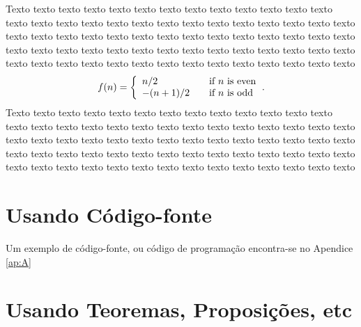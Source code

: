 Texto texto texto texto texto texto texto texto texto texto texto texto texto texto texto texto texto texto texto texto texto texto texto texto texto texto texto texto texto texto texto texto texto texto texto texto texto texto texto texto texto texto texto texto texto texto texto texto texto texto texto texto texto texto texto texto texto texto texto texto texto texto texto texto texto texto texto texto texto
	\begin{equation}
	\label{eq:sistema}
		\begin{aligned}
			f(n) = \left\{ 
			\begin{array}{l l}
			n/2 & \quad \text{if $n$ is even}\\
			-(n+1)/2 & \quad \text{if $n$ is odd}
			\end{array} \right.
		\end{aligned}.
	\end{equation}
Texto texto texto texto texto texto texto texto texto texto texto texto texto texto texto texto texto texto texto texto texto texto texto texto texto texto texto texto texto texto texto texto texto texto texto texto texto texto texto texto texto texto texto texto texto texto texto texto texto texto texto texto texto texto texto texto texto texto texto texto texto texto texto texto texto texto texto texto texto



\section{Usando Código-fonte}

Um exemplo de código-fonte, ou código de programação encontra-se no Apendice \ref{ap:A}

 
\section{Usando Teoremas, Proposições, etc}

